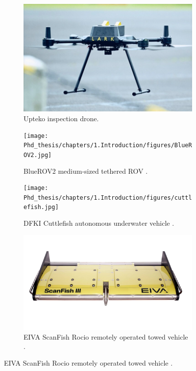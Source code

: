 \begin{figure}[!h]
    \centering
    \begin{subfigure}[b]{0.44\textwidth}
        \centering
        \includegraphics[width=\textwidth]{Phd_thesis/figs/lark.png}
        \caption{Upteko inspection drone.}
        \label{fig:subfig1}
    \end{subfigure}
    \hfill
    \begin{subfigure}[b]{0.49\textwidth}
        \centering
        \texttt{[image: Phd\_thesis/chapters/1.Introduction/figures/BlueROV2.jpg]}
        \caption{BlueROV2 medium-sized tethered ROV \cite{bluerobotics_bluerov2_nodate}.}
        \label{fig:subfig2}
    \end{subfigure}
    
    \vspace{0.5cm} %
    
    \begin{subfigure}[b]{0.46\textwidth}
        \centering
        \texttt{[image: Phd\_thesis/chapters/1.Introduction/figures/cuttlefish.jpg]}
        \caption{DFKI Cuttlefish autonomous underwater vehicle \cite{christensen_cuttlefish_nodate}.}
        \label{fig:subfig3}
    \end{subfigure}
    \hfill
    \begin{subfigure}[b]{0.49\textwidth}
        \centering
        \includegraphics[width=\textwidth]{Phd_thesis/chapters/1.Introduction/figures/scanfish_towed.jpg}
        \caption{EIVA ScanFish Rocio remotely operated towed vehicle \cite{eiva_scanfish_nodate}.}
        \label{fig:subfig4}
    \end{subfigure}
    

\end{figure}
